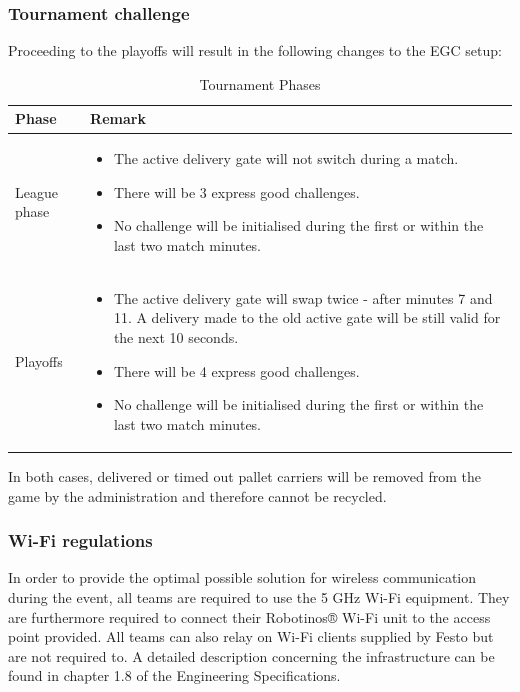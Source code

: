\documentclass[12pt,twoside]{article}
\begin{document}
\subsubsection{Tournament challenge}
Proceeding to the playoffs will result in the following changes to the EGC setup:
\begin{table}[h]
  \centering
  \begin{tabularx}{\linewidth}{l|X}
    \multicolumn{1}{l}{Phase} &\multicolumn{1}{l}{Remark}\\\hline
    League phase & 
    \begin{itemize}
    \item The active delivery gate will not switch during a match.
    \item There will be 3 express good challenges.
    \item     No challenge will be initialised during the first or within the last two match minutes.
    \end{itemize} \\
    Playoffs &
    \begin{itemize}
    \item The active delivery gate will swap twice - after minutes 7
      and 11. A delivery made to the old active gate will be still
      valid for the next 10 seconds.
    \item There will be 4 express good challenges. 
    \item No challenge will be initialised during the first or within
      the last two match minutes.
    \end{itemize}\\\hline
  \end{tabularx} 
  \caption{Tournament Phases}
  \label{tab:phases}
\end{table}



In both cases, delivered or timed out pallet carriers will be removed from the game by the administration and therefore cannot be recycled.

\subsubsection{Wi-Fi regulations}

In order to provide the optimal possible solution for wireless communication during the event, all teams are required to use the 5 GHz Wi-Fi equipment. They are furthermore required to connect their Robotinos® Wi-Fi unit to the access point provided. All teams can also relay on Wi-Fi clients supplied by Festo but are not required to. A detailed description concerning the infrastructure can be found in chapter 1.8 of the Engineering Specifications.
\end{document}
